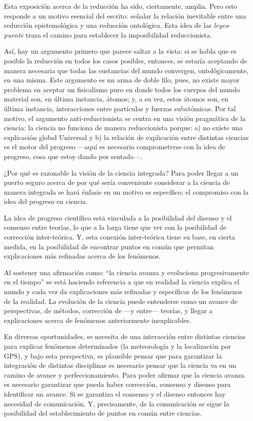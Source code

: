 \documentclass[]{book}
\begin{document}
\begin{refsection}
Esta exposición acerca de la reducción ha sido, ciertamente, amplia.
Pero esto responde a un motivo esencial del escrito: señalar la relación
inevitable entre una reducción epistemológica y una reducción
ontológica. Esta idea de las \emph{leyes}-\emph{puente} traza el camino
para establecer la imposibilidad reduccionista.

Así, hay un argumento primero que parece saltar a la vista: si se habla
que es posible la reducción en todos los casos posibles, entonces, se
estaría aceptando de manera necesaria que todas las sustancias del mundo
convergen, ontológicamente, en una misma. Este argumento es un arma de
doble filo, pues, no existe mayor problema en aceptar un fisicalismo
puro en donde todos los cuerpos del mundo material son, en última
instancia, átomos; y, a su vez, estos átomos son, en última instancia,
interacciones entre partículas y fuerzas subatómicas. Por tal motivo, el
argumento anti-reduccionista se centra en una visión pragmática de la
ciencia: la ciencia no funciona de manera reduccionista porque: a) no
existe una explicación global Universal y b) la relación de explicación
entre distintas ciencias es el motor del progreso ---aquí es necesario
comprometerse con la idea de progreso, cosa que estoy dando por
sentada---.

¿Por qué es razonable la visión de la ciencia integrada? Para poder
llegar a un puerto seguro acerca de por qué sería conveniente considerar
a la ciencia de manera integrada se hará énfasis en un motivo es
específico: el compromiso con la idea del progreso en ciencia.

La idea de progreso científico está vinculada a la posibilidad del
disenso y el consenso entre teorías, lo que a la larga tiene que ver con
la posibilidad de corrección inter-teórica. Y, esta conexión
inter-teórica tiene su base, en cierta medida, en la posibilidad de
encontrar puntos en común que permitan explicaciones más refinadas
acerca de los fenómenos.

Al sostener una afirmación como: ``la ciencia avanza y evoluciona
progresivamente en el tiempo'' se está haciendo referencia a que en
realidad la ciencia explica el mundo y cada vez da explicaciones más
refinadas y específicas de los fenómenos de la realidad. La evolución de
la ciencia puede entenderse como un avance de perspectivas, de métodos,
corrección de ---y entre--- teorías, y llegar a explicaciones acerca de
fenómenos anteriormente inexplicables.

En diversas oportunidades, se necesita de una interacción entre
distintas ciencias para explicar fenómenos determinados (la meteorología
y la localización por GPS), y bajo esta perspectiva, es plausible pensar
que para garantizar la integración de distintas disciplinas es necesario
pensar que la ciencia va en un camino de avance y perfeccionamiento.
Para poder afirmar que la ciencia avanza es necesario garantizar que
pueda haber corrección, consenso y disenso para identificar un avance.
Si se garantiza el consenso y el disenso entonces hay necesidad de
comunicación. Y, precisamente, de la comunicación se sigue la
posibilidad del establecimiento de puntos en común entre ciencias.


\end{refsection}
\end{document}
